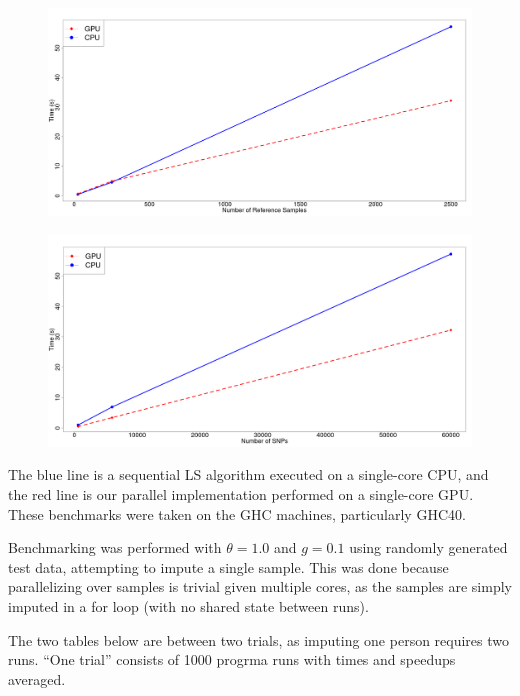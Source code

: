 \documentclass[12pt]{article}
\begin{document}
{
\begin{figure}[!hb]
  \includegraphics[scale=0.2]{sample}
\end{figure}
\begin{figure}[!hb]
  \includegraphics[scale=0.2]{snp}
\end{figure}
}

The blue line is a sequential LS algorithm executed on a single-core CPU, and
the red line is our parallel implementation performed on a single-core GPU.
These benchmarks were taken on the GHC machines, particularly GHC40.

Benchmarking was performed with $\theta = 1.0$ and $g = 0.1$ using randomly
generated test data, attempting to impute a single sample. This was done
because parallelizing over samples is trivial given multiple cores, as the
samples are simply imputed in a for loop (with no shared state between runs).

The two tables below are between two trials, as imputing one
person requires two runs. ``One trial'' consists of 1000 progrma runs with
times and speedups averaged.


\end{document}

